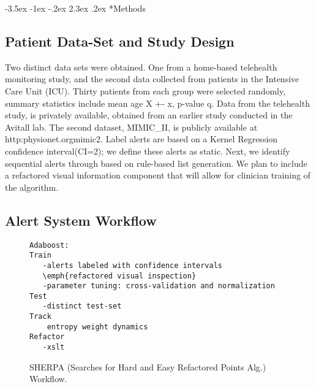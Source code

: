 \documentclass[12pt]{article}
\makeatletter
\renewcommand\section{\@startsection{section}{1}{\z@}%
                                  {-3.5ex \@plus -1ex \@minus -.2ex}%
                                  {2.3ex \@plus.2ex}%
                                  {\normalfont\bfseries}}
\makeatother
\begin{document}
\section*{Methods}

\subsection{Patient Data-Set and Study Design}
Two distinct data sets were obtained.  One from a home-based telehealth monitoring study, and the second data collected from patients in the Intensive Care Unit (ICU).  Thirty patients from each group were selected randomly, summary statistics include mean age X +- x, p-value q.  Data from the telehealth study, is privately available, obtained from an earlier study conducted in the Avitall lab.  The second dataset, MIMIC\_II, is publicly available at http:\/\/physionet.org\/mimic2\/.  Label alerts are based on a Kernel Regression confidence interval(CI=2); we define these alerts as static.  Next, we identify sequential alerts through based on rule-based list generation\cite{Pieri}.  We plan to include a refactored visual information component that will allow for clinician training of the algorithm.  
   
\subsection*{Alert System Workflow}
\begin{figure}[h!]
\begin{lstlisting}[frame=single]
Adaboost:
Train
   -alerts labeled with confidence intervals 
   \emph{refactored visual inspection}
   -parameter tuning: cross-validation and normalization
Test
   -distinct test-set
Track
    entropy weight dynamics
Refactor
   -xslt
\end{lstlisting}
\caption{SHERPA (Searches for Hard and Easy Refactored Points Alg.) Workflow.\label{fig:workflow1}}
\end{figure}
\end{document}
